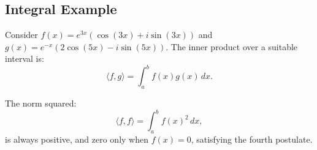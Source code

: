 \documentclass[12pt]{article}
\begin{document}
\subsection*{Integral Example}
Consider \( f(x) = e^{3x}( \cos(3x) + i \sin(3x) ) \) and \( g(x) = e^{-x} ( 2\cos(5x) - i \sin(5x) ) \). The inner product over a suitable interval is:
\[
\langle f, g \rangle = \int_a^b f(x) g(x) \, dx.
\]

The norm squared:
\[
\langle f, f \rangle = \int_a^b f(x)^2 \, dx,
\]
is always positive, and zero only when \( f(x) = 0 \), satisfying the fourth postulate.
\end{document}
